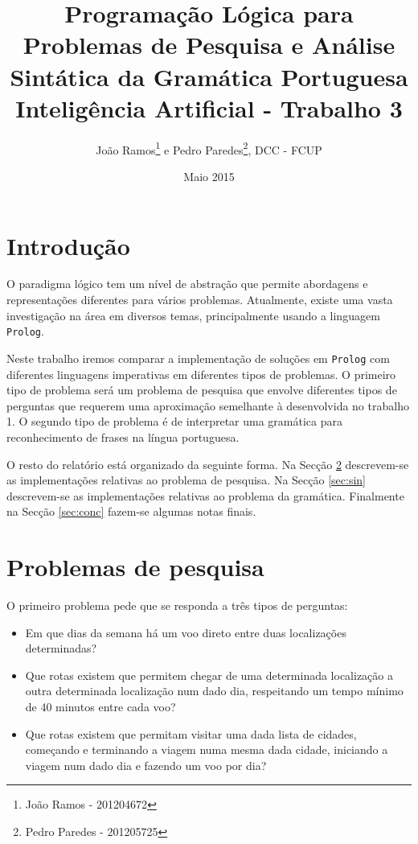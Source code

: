 \documentclass[12pt,a4paper,oneside]{article}
\title{Programação Lógica para Problemas de Pesquisa e Análise Sintática da Gramática Portuguesa\\
  \vspace{0.1in}
  \large{Inteligência Artificial - Trabalho 3}
}
\author{João Ramos\footnote{João Ramos - 201204672} e Pedro Paredes\footnote{Pedro Paredes - 201205725}, DCC - FCUP}
\date{Maio 2015}
\begin{document}
\maketitle


\section{Introdução}
\label{sec:intro}

O paradigma lógico tem um nível de abstração que permite abordagens e
representações diferentes para vários problemas. Atualmente, existe
uma vasta investigação na área em diversos temas, principalmente
usando a linguagem \texttt{Prolog}.

Neste trabalho iremos comparar a implementação de soluções em
\texttt{Prolog} com diferentes linguagens imperativas em diferentes
tipos de problemas. O primeiro tipo de problema será um problema de
pesquisa que envolve diferentes tipos de perguntas que requerem uma
aproximação semelhante à desenvolvida no trabalho 1. O segundo tipo de
problema é de interpretar uma gramática para reconhecimento de frases
na língua portuguesa.

O resto do relatório está organizado da seguinte forma. Na Secção
\ref{sec:pes} descrevem-se as implementações relativas ao problema de
pesquisa. Na Secção \ref{sec:sin} descrevem-se as implementações
relativas ao problema da gramática. Finalmente na Secção
\ref{sec:conc} fazem-se algumas notas finais.


\section{Problemas de pesquisa}
\label{sec:pes}

O primeiro problema pede que se responda a três tipos de perguntas:

\begin{itemize}
\item Em que dias da semana há um voo direto entre duas localizações
  determinadas?
\item Que rotas existem que permitem chegar de uma determinada
  localização a outra determinada localização num dado dia,
  respeitando um tempo mínimo de 40 minutos entre cada voo?
\item Que rotas existem que permitam visitar uma dada lista de
  cidades, começando e terminando a viagem numa mesma dada cidade,
  iniciando a viagem num dado dia e fazendo um voo por dia?
\end{itemize}
\end{document}
